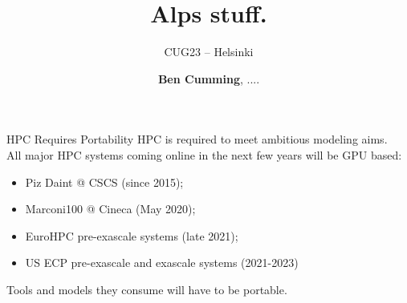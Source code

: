 \documentclass[aspectratio=43]{beamer}
\author{\textbf{Ben Cumming}, ....}
\title{Alps stuff.}
\subtitle{CUG23 -- Helsinki}
\begin{document}
\cscstitle



\begin{frame}[fragile]{HPC Requires Portability}
    HPC is required to meet ambitious modeling aims.
    \\ \vspace{15pt}
    All major HPC systems coming online in the next few years will be GPU based:
    \begin{itemize}
        \item Piz Daint @ CSCS (since 2015);
        \item Marconi100 @ Cineca (May 2020);
        \item EuroHPC pre-exascale systems (late 2021);
        \item US ECP pre-exascale and exascale systems (2021-2023)
    \end{itemize}
    \vspace{15pt}
    Tools and models they consume will have to be portable.
\end{frame}
\end{document}
